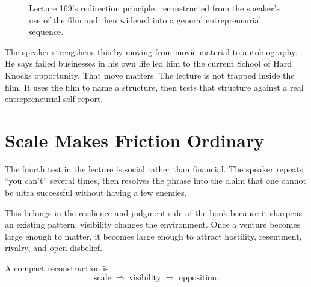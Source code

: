 \documentclass[11pt,oneside]{book}
\begin{document}
\begin{figure}[h]
\centering
{}
\caption{Lecture 169's redirection principle, reconstructed from the speaker's use of the film and then widened into a general entrepreneurial sequence.}
\end{figure}

The speaker strengthens this by moving from movie material to autobiography. He says failed businesses in his own life led him to the current School of Hard Knocks opportunity. That move matters. The lecture is not trapped inside the film. It uses the film to name a structure, then tests that structure against a real entrepreneurial self-report.

\section{Scale Makes Friction Ordinary}

The fourth test in the lecture is social rather than financial. The speaker repeats ``you can't'' several times, then resolves the phrase into the claim that one cannot be ultra successful without having a few enemies.

This belongs in the resilience and judgment side of the book because it sharpens an existing pattern: visibility changes the environment. Once a venture becomes large enough to matter, it becomes large enough to attract hostility, resentment, rivalry, and open disbelief.

A compact reconstruction is
\begin{equation}
\text{scale}
\;\Longrightarrow\;
\text{visibility}
\;\Longrightarrow\;
\text{opposition}.
\end{equation}
\end{document}
